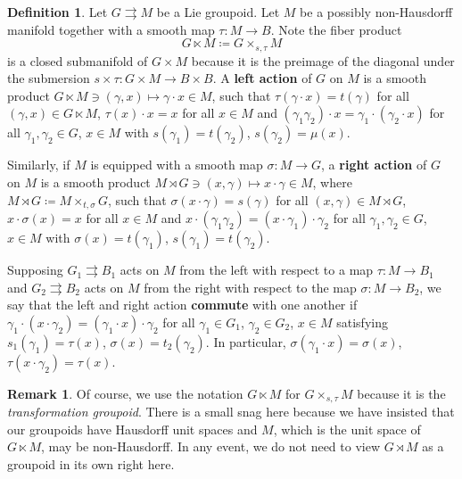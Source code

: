 \documentclass[12pt]{article}
\theoremstyle{plain}
\theoremstyle{definition}
\newtheorem{defn}[thm]{Definition}
\newtheorem{rmk}[thm]{Remark}
\numberwithin{equation}{section}
\begin{document}
\begin{defn}\label{actdef}
Let $G\rightrightarrows M$ be a Lie groupoid. Let $M$ be a possibly non-Hausdorff manifold together with a smooth map $\tau : M \to B$. Note the fiber product 
\[ G\ltimes M \coloneqq G\times_{s,\tau}M\]
is a closed submanifold of $G \times M$ because it is  the preimage of the diagonal under the submersion $s \times \tau : G \times M \to B \times B$. A \textbf{left action} of $G$ on $M$  is a smooth product $G\ltimes  M \ni (\gamma, x)  \mapsto \gamma \cdot x \in  M$, such that $\tau(\gamma \cdot x) = t(\gamma)$ for all $(\gamma, x) \in G \ltimes M$, $\tau(x) \cdot x = x$ for all $x \in M$ and $(\gamma_1\gamma_2)\cdot x = \gamma_1 \cdot (\gamma_2 \cdot x)$ for all $\gamma_1,\gamma_2 \in G$, $x \in M$ with $s(\gamma_1) = t(\gamma_2)$, $s(\gamma_2) = \mu(x)$. 

Similarly, if $M$ is equipped with a smooth map $\sigma : M \to G$, a \textbf{right action} of $G$ on $M$ is a smooth product $M \rtimes G  \ni (x,\gamma) \mapsto x \cdot \gamma \in M$, where $M\rtimes G\coloneqq M \times_{t,\sigma} G$,  such that $\sigma( x \cdot \gamma)=s(\gamma)$ for all $(x,\gamma) \in M \rtimes G$, $x \cdot \sigma(x) =x$ for all $x \in M$ and $x \cdot (\gamma_1\gamma_2) = (x\cdot \gamma_1)\cdot \gamma_2$ for all $\gamma_1,\gamma_2 \in G$, $x \in M$ with $\sigma(x) = t(\gamma_1)$, $s(\gamma_1)=t(\gamma_2)$.

Supposing $G_1\rightrightarrows B_1$ acts on $M$ from the left with respect to a map $\tau : M \to B_1$ and $G_2\rightrightarrows B_2$ acts on $M$ from the right with respect to the map $\sigma : M \to B_2$, we say that the left and right action \textbf{commute} with one another if $\gamma_1 \cdot (x \cdot \gamma_2) = (\gamma_1 \cdot x) \cdot \gamma_2$ for all $\gamma_1 \in G_1$, $\gamma_2 \in G_2$, $x \in M$ satisfying $s_1(\gamma_1)=\tau(x)$, $\sigma(x)=t_2(\gamma_2)$. In particular, $\sigma(\gamma_1 \cdot x) = \sigma(x)$, $\tau(x \cdot \gamma_2)=\tau(x)$.
\end{defn}

\begin{rmk}
Of course, we use the notation $G\ltimes M$ for $G\times_{s,\tau}M$ because it is the \emph{transformation groupoid}. There is a small snag here because we have insisted that our groupoids have Hausdorff unit spaces and $M$, which is the unit space of $G\ltimes M$, may be non-Hausdorff. In any event, we do not need to view $G\rtimes M$ as a groupoid in its own right here.
\end{rmk}
\end{document}
